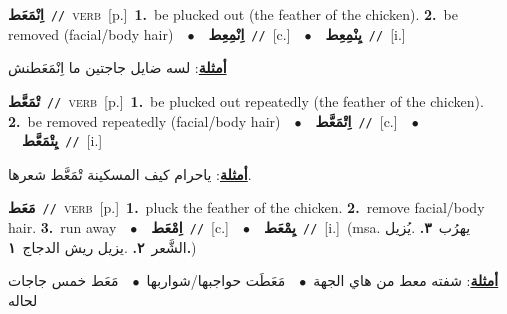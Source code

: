 \documentclass[10pt,a4paper,twoside]{article} %
\begin{document}
\begin{multicols}{2}
{\setlength\topsep{0pt}\textbf{\foreignlanguage{arabic}{اِنْمَعَط}}\ {\color{gray}\texttt{//}\color{black}}\ \textsc{verb}\ [p.]\ \textbf{1.}~be plucked out (the feather of the chicken).  \textbf{2.}~be removed (facial/body hair)\ \ $\bullet$\ \ \setlength\topsep{0pt}\textbf{\foreignlanguage{arabic}{اِنْمِعِط}}\ {\color{gray}\texttt{//}\color{black}}\ [c.]\ \ $\bullet$\ \ \setlength\topsep{0pt}\textbf{\foreignlanguage{arabic}{يِنْمِعِط}}\ {\color{gray}\texttt{//}\color{black}}\ [i.]\  \begin{flushright}\color{gray}\foreignlanguage{arabic}{\textbf{\underline{\foreignlanguage{arabic}{أمثلة}}}: لسه ضايل جاجتين ما اِنْمَعَطنش}\end{flushright}\color{black}} \vspace{2mm}

{\setlength\topsep{0pt}\textbf{\foreignlanguage{arabic}{تْمَعَّط}}\ {\color{gray}\texttt{//}\color{black}}\ \textsc{verb}\ [p.]\ \textbf{1.}~be plucked out repeatedly (the feather of the chicken).  \textbf{2.}~be removed repeatedly  (facial/body hair)\ \ $\bullet$\ \ \setlength\topsep{0pt}\textbf{\foreignlanguage{arabic}{اِتْمَعَّط}}\ {\color{gray}\texttt{//}\color{black}}\ [c.]\ \ $\bullet$\ \ \setlength\topsep{0pt}\textbf{\foreignlanguage{arabic}{يِتْمَعَّط}}\ {\color{gray}\texttt{//}\color{black}}\ [i.]\  \begin{flushright}\color{gray}\foreignlanguage{arabic}{\textbf{\underline{\foreignlanguage{arabic}{أمثلة}}}: ياحرام كيف المسكينة تْمَعَّط شعرها.}\end{flushright}\color{black}} \vspace{2mm}

{\setlength\topsep{0pt}\textbf{\foreignlanguage{arabic}{مَعَط}}\ {\color{gray}\texttt{//}\color{black}}\ \textsc{verb}\ [p.]\ \textbf{1.}~pluck the feather of the chicken.  \textbf{2.}~remove facial/body hair.  \textbf{3.}~run away\ \ $\bullet$\ \ \setlength\topsep{0pt}\textbf{\foreignlanguage{arabic}{اِمْعَط}}\ {\color{gray}\texttt{//}\color{black}}\ [c.]\ \ $\bullet$\ \ \setlength\topsep{0pt}\textbf{\foreignlanguage{arabic}{يِمْعَط}}\ {\color{gray}\texttt{//}\color{black}}\ [i.]\ \color{gray}(msa. \foreignlanguage{arabic}{يهرُب}~\foreignlanguage{arabic}{\textbf{٣.}}  .\foreignlanguage{arabic}{يُزيل الشَّعر}~\foreignlanguage{arabic}{\textbf{٢.}}  .\foreignlanguage{arabic}{يزيل ريش الدجاج}~\foreignlanguage{arabic}{\textbf{١.}})\color{black}\  \begin{flushright}\color{gray}\foreignlanguage{arabic}{\textbf{\underline{\foreignlanguage{arabic}{أمثلة}}}: شفته معط من هاي الجهة\ $\bullet$\ \  مَعَطَت حواجبها/شواربها\ $\bullet$\ \  مَعَط خمس جاجات لحاله}\end{flushright}\color{black}} \vspace{2mm}


\end{multicols}
\end{document}
